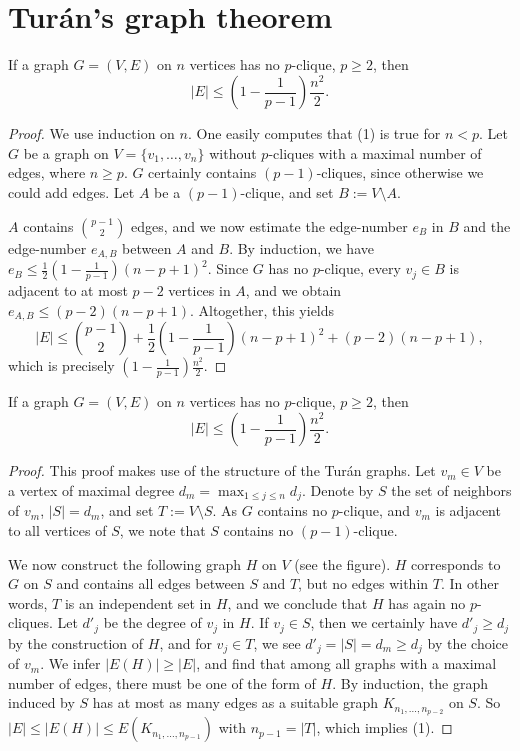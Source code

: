 \chapter{Turán's graph theorem}

\begin{theorem}
  \label{ch41proof1}
If a graph $G = (V, E)$ on $n$ vertices has no $p$-clique, $p \geq 2$, then
\[
|E| \leq \left(1 - \frac{1}{p - 1}\right) \frac{n^2}{2}. \tag{1}
\]
\end{theorem}
\begin{proof}
   We use induction on $n$. One easily computes that (1) is true for $n < p$.
   Let $G$ be a graph on $V = \{v_1, \dots, v_n\}$ without $p$-cliques with a maximal number of
   edges, where $n \geq p$. $G$ certainly contains $(p - 1)$-cliques, since otherwise we could
   add edges. Let $A$ be a $(p - 1)$-clique, and set $B := V \setminus A$.

$A$ contains $\binom{p - 1}{2}$ edges, and we now estimate the edge-number $e_B$ in $B$ and the
edge-number $e_{A, B}$ between $A$ and $B$. By induction,
we have $e_B \leq \frac{1}{2} \left(1 - \frac{1}{p - 1}\right) (n - p + 1)^2$.
Since $G$ has no $p$-clique, every $v_j \in B$ is adjacent to at most $p - 2$ vertices in $A$,
and we obtain $e_{A, B} \leq (p - 2)(n - p + 1)$. Altogether, this yields
\[
|E| \leq \binom{p - 1}{2} + \frac{1}{2} \left(1 - \frac{1}{p - 1}\right) (n - p + 1)^2 + (p - 2)(n - p + 1),
\]
which is precisely $\left(1 - \frac{1}{p - 1}\right) \frac{n^2}{2}$.
\end{proof}

\begin{theorem}
  \label{ch41proof2}
If a graph $G = (V, E)$ on $n$ vertices has no $p$-clique, $p \geq 2$, then
\[
|E| \leq \left(1 - \frac{1}{p - 1}\right) \frac{n^2}{2}. \tag{1}
\]
\end{theorem}
\begin{proof}
  This proof makes use of the structure of the Turán graphs. Let $v_m \in V$ be a vertex of
  maximal degree $d_m = \max_{1 \leq j \leq n} d_j$. Denote by $S$ the set of neighbors of
  $v_m$, $|S| = d_m$, and set $T := V \setminus S$. As $G$ contains no $p$-clique, and $v_m$ is
  adjacent to all vertices of $S$, we note that $S$ contains no $(p - 1)$-clique.

We now construct the following graph $H$ on $V$ (see the figure). $H$ corresponds to $G$ on $S$ and
contains all edges between $S$ and $T$, but no edges within $T$. In other words, $T$ is an
independent set in $H$, and we conclude that $H$ has again no $p$-cliques. Let $d'_j$ be the
degree of $v_j$ in $H$. If $v_j \in S$, then we certainly have $d'_j \geq d_j$ by the
construction of $H$, and for $v_j \in T$, we see $d'_j = |S| = d_m \geq d_j$ by the choice of $v_m$.
We infer $|E(H)| \geq |E|$, and find that among all graphs with a maximal number of edges,
there must be one of the form of $H$. By induction, the graph induced by $S$ has at most as many
edges as a suitable graph $K_{n_1, \dots, n_{p - 2}}$ on $S$.
So $|E| \leq |E(H)| \leq E(K_{n_1, \dots, n_{p - 1}})$ with $n_{p - 1} = |T|$, which implies (1).
\end{proof}

